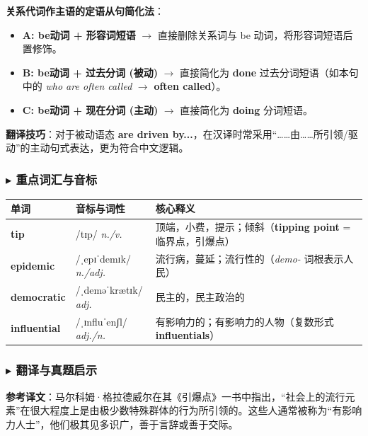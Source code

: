 \documentclass[cn,normal,11pt]{elegantnote}
\newcommand{\retrokey}[1]{{\color{accentcolor}\textbf{#1}}}
\renewcommand{\citshape}{\kaishu\fontspec{Arial}}
\begin{document}
\begin{proposition}[定语从句多重简化的底层逻辑]
  \textbf{关系代词作主语的定语从句简化法}：
  \begin{itemize}
    \item \textbf{A: be动词 + 形容词短语} $\rightarrow$ 直接删除关系词与 be 动词，将形容词短语后置修饰。
    \item \textbf{B: be动词 + 过去分词 (被动)} $\rightarrow$ 直接简化为 \textbf{done} 过去分词短语（如本句中的 \textit{who are often called} $\rightarrow$ \textbf{often called}）。
    \item \textbf{C: be动词 + 现在分词 (主动)} $\rightarrow$ 直接简化为 \textbf{doing} 分词短语。
  \end{itemize}
  \textbf{翻译技巧}：对于被动语态 \textbf{are driven by...}，在汉译时常采用“……由……所引领/驱动”的主动句式表达，更为符合中文逻辑。
\end{proposition}

\subsubsection*{$\blacktriangleright$ 重点词汇与音标}
\noindent
\begin{tabularx}{\textwidth}{l X p{7cm}}
  \toprule
  \textbf{单词} & \textbf{音标与词性} & \textbf{核心释义} \\
  \midrule
  \retrokey{tip} & {\citshape /tɪp/} \textit{n./v.} & 顶端，小费，提示；倾斜（\textbf{tipping point} = 临界点，引爆点） \\
  \midrule
  \retrokey{epidemic} & {\citshape /ˌepɪˈdemɪk/} \textit{n./adj.} & 流行病，蔓延；流行性的（\textit{demo-} 词根表示人民） \\
  \midrule
  \retrokey{democratic} & {\citshape /ˌdeməˈkrætɪk/} \textit{adj.} & 民主的，民主政治的 \\
  \midrule
  \retrokey{influential} & {\citshape /ˌɪnfluˈenʃl/} \textit{adj./n.} & 有影响力的；有影响力的人物（复数形式 \textbf{influentials}） \\
  \bottomrule
\end{tabularx}

\subsubsection*{$\blacktriangleright$ 翻译与真题启示}
\begin{remark}
  \textbf{参考译文}：马尔科姆·格拉德威尔在其《引爆点》一书中指出，“社会上的流行元素”在很大程度上是由极少数特殊群体的行为所引领的。这些人通常被称为“有影响力人士”，他们极其见多识广，善于言辞或善于交际。
\end{remark}
\end{document}
